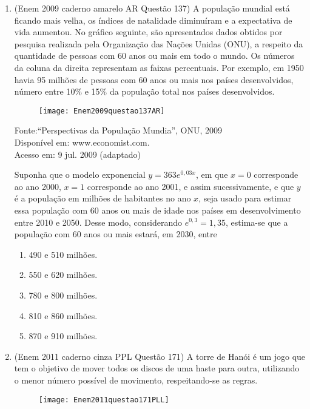 \begin{enumerate}
	\item (Enem 2009 caderno amarelo AR Questão 137) A população mundial está ficando mais velha, os índices de natalidade diminuíram e a expectativa de vida aumentou. No gráfico seguinte, são apresentados dados obtidos por pesquisa realizada pela Organização das Nações Unidas (ONU), a respeito da quantidade de pessoas com 60 anos ou mais em todo o mundo. Os números da coluna da direita representam as faixas percentuais. Por exemplo, em 1950 havia 95 milhões de pessoas com 60 anos ou mais nos países desenvolvidos, número entre 10\% e 15\% da população total nos países desenvolvidos.
	\begin{figure}[H]
		\centering
		\texttt{[image: Enem2009questao137AR]}
		\caption{}
		\label{fig:enem2009questao137ar}
	\end{figure}		
	\begin{flushright}
		{\tiny Fonte:``Perspectivas da População Mundia'', ONU, 2009\\
			Disponível em: www.economist.com.\\ 
			Acesso em: 9 jul. 2009 (adaptado)\\}
	\end{flushright}
	
	Suponha que o modelo exponencial $ y=363e^{0,03x} $, em que $ x=0 $ corresponde ao ano 2000, $ x=1 $ corresponde ao ano 2001, e assim sucessivamente, e que $ y $ é a população em milhões de habitantes no ano $ x $, seja usado para estimar essa população com 60 anos ou mais de idade nos países em desenvolvimento entre 2010 e 2050.
	Desse modo, considerando $ e^{0,3}=1,35 $, estima-se que a população com 60 anos ou mais estará, em 2030, entre
	\begin{enumerate}
		\item 490 e 510 milhões.
		\item 550 e 620 milhões.
		\item 780 e 800 milhões.
		\item 810 e 860 milhões.
		\item 870 e 910 milhões. 
	\end{enumerate}
	\clearpage
	\item (Enem 2011 caderno cinza PPL Questão 171) A torre de Hanói é um jogo que tem o objetivo de mover todos os discos de uma haste para outra, utilizando o menor número possível de movimento, respeitando-se as regras.
	\begin{figure}[H]
		\centering
		\texttt{[image: Enem2011questao171PLL]}
		\caption{}
		\label{fig:enem2011questao171pll}
	\end{figure}
	

\end{enumerate}
